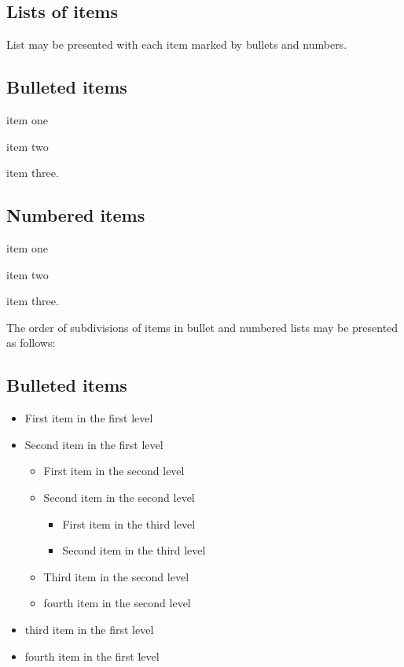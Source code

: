 \documentclass{ijcs_template}
\begin{document}
\subsection{Lists of items}
List may be presented with each item marked by bullets and numbers.

\subsection*{Bulleted items}

\begin{itemlist}
\item item one
\item item two
\item item three.
\end{itemlist}

\subsection*{Numbered items}

\begin{arabiclist}
\item item one
\item item two
\item item three.
\end{arabiclist}

The order of subdivisions of items in bullet and numbered lists may be
presented as follows:

\subsection*{Bulleted items}

\begin{itemize}
\item First item in the first level
\item Second item in the first level
\begin{itemize}
\item First item in the second level
\item Second item in the second level
\begin{itemize}
\item First item in the third level
\item Second item in the third level
\end{itemize}
\item Third item in the second level
\item fourth item in the second level
\end{itemize}
\item third item in the first level
\item fourth item in the first level
\end{itemize}
\end{document}
